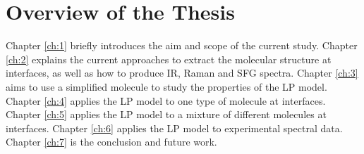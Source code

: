 \section{Overview of the Thesis}
Chapter \ref{ch:1} briefly introduces the aim and scope of the current study. Chapter \ref{ch:2} explains the current approaches to extract the molecular structure at interfaces, as well as how to produce IR, Raman and SFG spectra. Chapter \ref{ch:3} aims to use a simplified molecule to study the properties of the LP model. Chapter \ref{ch:4} applies the LP model to one type of molecule at interfaces. Chapter \ref{ch:5} applies the LP model to a mixture of different molecules at interfaces. Chapter \ref{ch:6} applies the LP model to experimental spectral data. Chapter \ref{ch:7} is the conclusion and future work.
